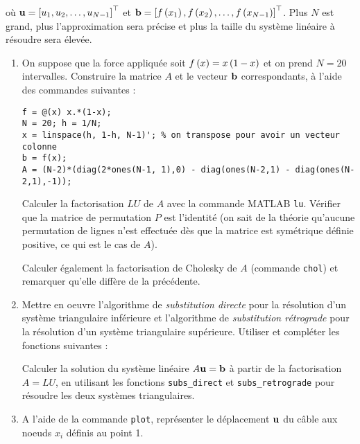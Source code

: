 où $\mathbf{u} = \left[u_{1}, u_{2}, \dots, u_{N-1}\right]^{\top}$ et $\mathbf{b} = \left[f \left(x_{1}\right), f \left(x_{2}\right), \dots, f \left(x_{N-1}\right)\right]^{\top}$.
Plus $N$ est grand, plus l'approximation sera précise et plus la taille du système linéaire à résoudre sera élevée.

\begin{enumerate}[label=\alph*)]
  \item On suppose que la force appliquée soit $f \left(x\right) = x \left(1 - x\right)$ et on prend $N = 20$ intervalles.
        Construire la matrice $A$ et le vecteur $\mathbf{b}$ correspondants, à l'aide des commandes suivantes :

\begin{verbatim}
f = @(x) x.*(1-x);
N = 20; h = 1/N;
x = linspace(h, 1-h, N-1)'; % on transpose pour avoir un vecteur colonne
b = f(x);
A = (N-2)*(diag(2*ones(N-1, 1),0) - diag(ones(N-2,1) - diag(ones(N-2,1),-1));
\end{verbatim}
        
        Calculer la factorisation $LU$ de $A$ avec la commande \textsc{MATLAB} \texttt{lu}.
        Vérifier que la matrice de permutation $P$ est l'identité (on sait de la théorie qu'aucune permutation de lignes n'est effectuée dès que la matrice est symétrique définie positive, ce qui est le cas de $A$).
        
        Calculer également la factorisation de Cholesky de $A$ (commande \texttt{chol}) et remarquer qu'elle diffère de la précédente.
        
        
  \item Mettre en oeuvre l'algorithme de \textit{substitution directe} pour la résolution d'un système triangulaire inférieure et l'algorithme de \textit{substitution rétrograde} pour la résolution d'un système triangulaire supérieure. Utiliser et compléter les fonctions suivantes :
  
        

        
  
        Calculer la solution du système linéaire $A \mathbf{u} = \mathbf{b}$ à partir de la factorisation $A = LU$, en utilisant les fonctions \texttt{subs\_direct} et \texttt{subs\_retrograde} pour résoudre les deux systèmes triangulaires.
  
  
  \item A l'aide de la commande \texttt{plot}, représenter le déplacement $\mathbf{u}$ du câble aux noeuds $x_{i}$ définis au point 1.
  

\end{enumerate}
